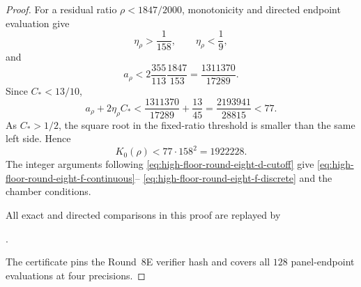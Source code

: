 \documentclass[11pt]{article}
\theoremstyle{remark}
\begin{document}
\begin{proof}
For a residual ratio $\rho<1847/2000$, monotonicity and directed endpoint
evaluation give
\[
 \eta_\rho>\frac1{158},\qquad \eta_\rho<\frac19,
\]
and
\[
 a_\rho<2\frac{355}{113}\frac{1847}{153}
 =\frac{1311370}{17289}.
\]
Since $C_*<13/10$,
\[
 a_\rho+2\eta_\rho C_*
 <\frac{1311370}{17289}+\frac{13}{45}
 =\frac{2193941}{28815}<77.
\]
As $C_*>1/2$, the square root in the fixed-ratio threshold is smaller
than the same left side.  Hence
\begin{equation}
 \boxed{K_0(\rho)<77\mathbin{\cdot}158^2=1922228.}
 \label{eq:high-floor-round-eight-f-cutoff}
\end{equation}
The integer arguments following
\eqref{eq:high-floor-round-eight-d-cutoff} give
\eqref{eq:high-floor-round-eight-f-continuous}--%
\eqref{eq:high-floor-round-eight-f-discrete} and the chamber conditions.

All exact and directed comparisons in this proof are replayed by
\begin{center}
 \small{}.
\end{center}
The certificate pins the Round~8E verifier hash and covers all $128$
panel-endpoint evaluations at four precisions.
\end{proof}
\end{document}
